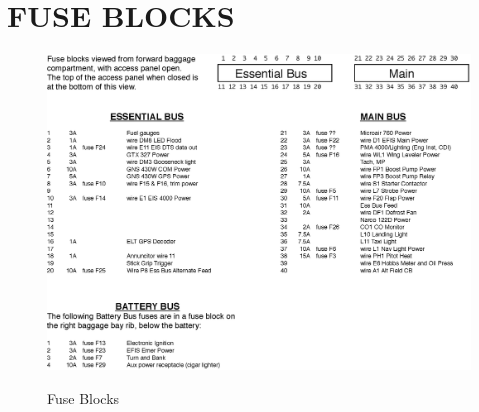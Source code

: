 \section{FUSE BLOCKS}
\begin{figure}
  \centering
  \includegraphics[width=1.2\textwidth, angle=90]{../Diagrams/Fuse_Blocks_POH}
  \label{fig:FuseBlocks}
  \caption{Fuse Blocks}
\end{figure}
\cleardoublepage 

